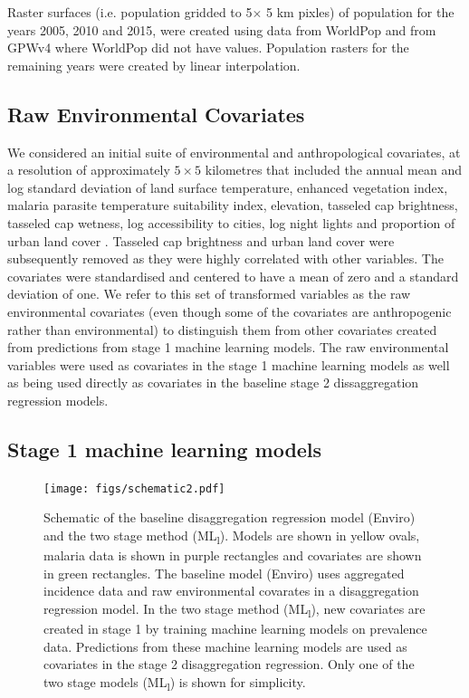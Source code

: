 \documentclass[review]{elsarticle}
\begin{document}
Raster surfaces (i.e. population gridded to 5$ \times$ 5 km pixles) of population for the years 2005, 2010 and 2015, were created using data from WorldPop \citep{linard2012population,gaughan2013high,  sorichetta2015high} and from GPWv4 \citep{gpw4} where WorldPop did not have values. 
Population rasters for the remaining years were created by linear interpolation. 

\subsection{Raw Environmental Covariates}

We considered an initial suite of environmental and anthropological covariates, at a resolution of approximately $5 \times 5$ kilometres that included the annual mean and log standard deviation of land surface temperature, enhanced vegetation index, malaria parasite temperature suitability index, elevation, tasseled cap brightness, tasseled cap wetness, log accessibility to cities, log night lights and proportion of urban land cover \citep{weiss2014air, weiss2015re, weiss2018global, gething2011modelling}. 
Tasseled cap brightness and urban land cover were subsequently removed as they were highly correlated with other variables. 
The covariates were standardised and centered to have a mean of zero and a standard deviation of one. 
We refer to this set of transformed variables as the raw environmental covariates (even though some of the covariates are anthropogenic rather than environmental) to distinguish them from other covariates created from predictions from stage 1 machine learning models.
The raw environmental variables were used as covariates in the stage 1 machine learning models as well as being used directly as covariates in the baseline stage 2 dissaggregation regression models.



\subsection{Stage 1 machine learning models}


\begin{figure}[t!]
  \centering
  \texttt{[image: figs/schematic2.pdf]}
\caption{
  Schematic of the baseline disaggregation regression model (Enviro) and the two stage method (ML\textsubscript{l}). 
  Models are shown in yellow ovals, malaria data is shown in purple rectangles and covariates are shown in green rectangles.
  The baseline model (Enviro) uses aggregated incidence data and raw environmental covarates in a disaggregation regression model.
  In the two stage method (ML\textsubscript{l}), new covariates are created in stage 1 by training machine learning models on prevalence data.
  Predictions from these machine learning models are used as covariates in the stage 2 disaggregation regression.
  Only one of the two stage models (ML\textsubscript{l}) is shown for simplicity.
}
\label{f:schem}
\end{figure}
\end{document}
